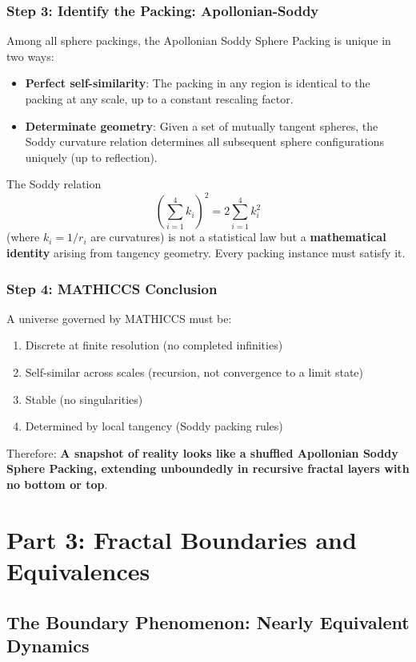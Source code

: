 \documentclass[11pt,a4paper]{article}
\begin{document}
\subsubsection{Step 3: Identify the Packing: Apollonian-Soddy}

Among all sphere packings, the Apollonian Soddy Sphere Packing is unique in two ways:

\begin{itemize}
\item \textbf{Perfect self-similarity}: The packing in any region is identical to the packing at any scale, up to a constant rescaling factor.
\item \textbf{Determinate geometry}: Given a set of mutually tangent spheres, the Soddy curvature relation determines all subsequent sphere configurations uniquely (up to reflection).
\end{itemize}

The Soddy relation
\[
\left(\sum_{i=1}^4 k_i\right)^2 = 2\sum_{i=1}^4 k_i^2
\]
(where $k_i = 1/r_i$ are curvatures) is not a statistical law but a \textbf{mathematical identity} arising from tangency geometry. Every packing instance must satisfy it.

\subsubsection{Step 4: MATHICCS Conclusion}

A universe governed by MATHICCS must be:
\begin{enumerate}
\item Discrete at finite resolution (no completed infinities)
\item Self-similar across scales (recursion, not convergence to a limit state)
\item Stable (no singularities)
\item Determined by local tangency (Soddy packing rules)
\end{enumerate}

Therefore: \textbf{A snapshot of reality looks like a shuffled Apollonian Soddy Sphere Packing, extending unboundedly in recursive fractal layers with no bottom or top}.

\section{Part 3: Fractal Boundaries and Equivalences}

\subsection{The Boundary Phenomenon: Nearly Equivalent Dynamics}
\end{document}

